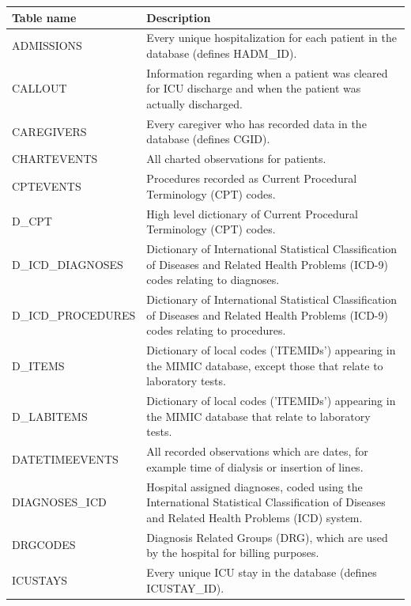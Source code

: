 \documentclass[english]{article}
\begin{document}

\begin{center}
\begin{table}
\begin{tabular}{|l|p{10.5cm}|}
    \hline
    Table name & Description \\
    \hline
    ADMISSIONS & Every unique hospitalization for each patient in the database (defines HADM\_ID). \\
    \hline
    CALLOUT & Information regarding when a patient was cleared for ICU discharge and when the patient was actually discharged. \\
    \hline
    CAREGIVERS & Every caregiver who has recorded data in the database (defines CGID). \\
    \hline
    CHARTEVENTS & All charted observations for patients. \\
    \hline
    CPTEVENTS & Procedures recorded as Current Procedural Terminology (CPT) codes. \\
    \hline
    D\_CPT & High level dictionary of Current Procedural Terminology (CPT) codes. \\
    \hline
    D\_ICD\_DIAGNOSES & Dictionary of International Statistical Classification of Diseases and Related Health Problems (ICD-9) codes relating to diagnoses. \\
    \hline
    D\_ICD\_PROCEDURES & Dictionary of International Statistical Classification of Diseases and Related Health Problems (ICD-9) codes relating to procedures. \\
    \hline
    D\_ITEMS & Dictionary of local codes ('ITEMIDs') appearing in the MIMIC database, except those that relate to laboratory tests. \\
    \hline
    D\_LABITEMS & Dictionary of local codes ('ITEMIDs') appearing in the MIMIC database that relate to laboratory tests. \\
    \hline
    DATETIMEEVENTS & All recorded observations which are dates, for example time of dialysis or insertion of lines. \\
    \hline
    DIAGNOSES\_ICD & Hospital assigned diagnoses, coded using the International Statistical Classification of Diseases and Related Health Problems (ICD) system. \\
    \hline
    DRGCODES & Diagnosis Related Groups (DRG), which are used by the hospital for billing purposes. \\
    \hline
    ICUSTAYS & Every unique ICU stay in the database (defines ICUSTAY\_ID). \\

\end{tabular}
\end{table}
\end{center}
\end{document}
